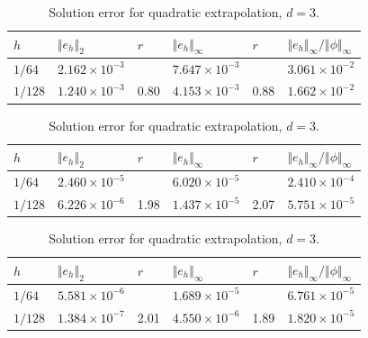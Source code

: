 \documentclass[a4paper,10pt,3p,final,pdftex]{elsarticle}
\begin{document}
\begin{table}[htb]
  \begin{center}
    \begin{tabular}{llllll}
      \hline
      $h$ & $\Vert e_h \Vert_2$ & $r$ & $\Vert e_h
      \Vert_\infty$ & $r$ & $\Vert e_h \Vert_\infty /
      \Vert \phi \Vert_\infty$ \\ [0.2ex] \hline 
      \vphantom{\rule{0pt}{2.7ex}}
      $1/64$  & $2.162 \times 10^{-3}$ & & $7.647 \times 10^{-3}$ & &
      $3.061 \times 10^{-2}$ \\ 
      $1/128$ & $1.240 \times 10^{-3}$ & 0.80 & $4.153 \times 10^{-3}$ &
      0.88 & $1.662 \times 10^{-2}$ \\ [0.2ex]
      \hline
    \end{tabular}
    \caption{Solution error for constant extrapolation, $d=3$.}
    \label{tbl:rel_error_const}
  \end{center}

  \begin{center}
    \begin{tabular}{llllll}
      \hline
      $h$ & $\Vert e_h \Vert_2$ & $r$ & $\Vert e_h
      \Vert_\infty$ & $r$ & $\Vert e_h \Vert_\infty /
      \Vert \phi \Vert_\infty$\\ [0.2ex]
      \hline 
      \vphantom{\rule{0pt}{2.7ex}}
      $1/64$  & $2.460 \times 10^{-5}$ & & $6.020 \times 10^{-5}$ & &
      $2.410 \times 10^{-4}$ \\
      $1/128$ & $6.226 \times 10^{-6}$ & 1.98 & $1.437 \times 10^{-5}$ &
      2.07 & $5.751 \times 10^{-5}$ \\ [0.2ex]
      \hline
    \end{tabular}
    \caption{Solution error for linear extrapolation, $d=3$.}
    \label{tbl:rel_error_lin}
  \end{center}

  \begin{center}
    \begin{tabular}{llllll}
      \hline
      $h$ & $\Vert e_h \Vert_2$ & $r$ & $\Vert e_h
      \Vert_\infty$ & $r$ & $\Vert e_h \Vert_\infty /
      \Vert \phi \Vert_\infty$\\ [0.2ex]
      \hline 
      \vphantom{\rule{0pt}{2.7ex}}
      $1/64$  & $5.581 \times 10^{-6}$ & & $1.689 \times 10^{-5}$ & &
      $6.761 \times 10^{-5}$ \\ 
      $1/128$ & $1.384 \times 10^{-7}$ & 2.01 & $4.550 \times 10^{-6}$ &
      1.89 & $1.820 \times 10^{-5}$ \\ [0.2ex]
      \hline
    \end{tabular}
    \caption{Solution error for quadratic extrapolation, $d=3$.}
    \label{tbl:rel_error_quad}
  \end{center}
\end{table}
\end{document}

